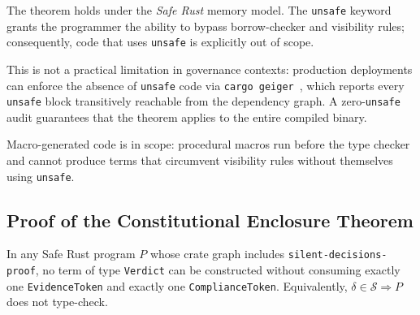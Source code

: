 The theorem holds under the \emph{Safe Rust} memory model.
The \texttt{unsafe} keyword grants the programmer the ability to
bypass borrow-checker and visibility rules; consequently, code that
uses \texttt{unsafe} is explicitly out of scope.

This is not a practical limitation in governance contexts: production
deployments can enforce the absence of \texttt{unsafe} code via
\texttt{cargo geiger}~\cite{cargogeiger}, which reports every
\texttt{unsafe} block transitively reachable from the dependency
graph.  A zero-\texttt{unsafe} audit guarantees that the theorem
applies to the entire compiled binary.

Macro-generated code is in scope: procedural macros run before the
type checker and cannot produce terms that circumvent visibility rules
without themselves using \texttt{unsafe}.

\subsection{Proof of the Constitutional Enclosure Theorem}
\label{sec:proof}

\begin{theorem}
\label{thm:enclosure}
In any Safe Rust program $P$ whose crate graph includes
\texttt{silent-decisions-proof}, no term of type \texttt{Verdict}
can be constructed without consuming exactly one \texttt{EvidenceToken}
and exactly one \texttt{ComplianceToken}.  Equivalently,
$\delta \in \mathcal{S} \Rightarrow P$ does not type-check.
\end{theorem}

